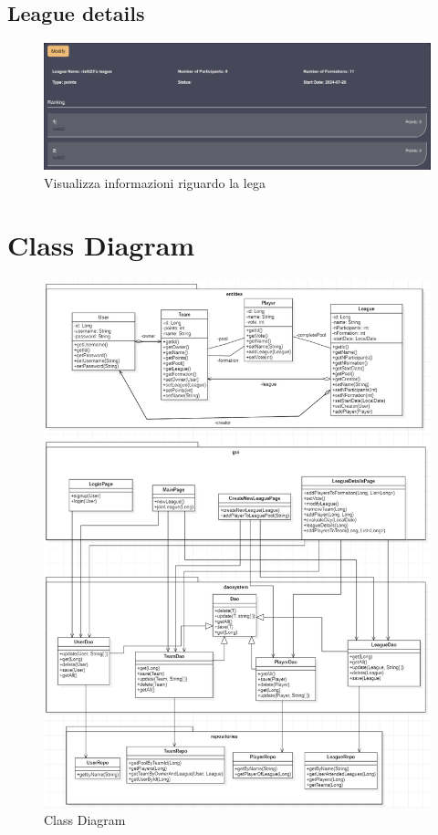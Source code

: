 \documentclass[twoside,openright,titlepage,fleqn,headinclude,12pt,a4paper,BCOR=5mm,footinclude]{scrbook}
\begin{document}
\subsection{League details}

\begin{figure}[H]
  \centering
  \includegraphics[width=\linewidth]{images/detailLeague.png}
  \caption{Visualizza informazioni riguardo la lega}
  \label{fig:detail}
\end{figure}

\section{Class Diagram}


\begin{figure}[H]
  \centering
  \includegraphics[width=\linewidth]{images/classDia.png}
  \caption{Class Diagram}
  \label{fig:Class Diagram}
\end{figure}
\end{document}
